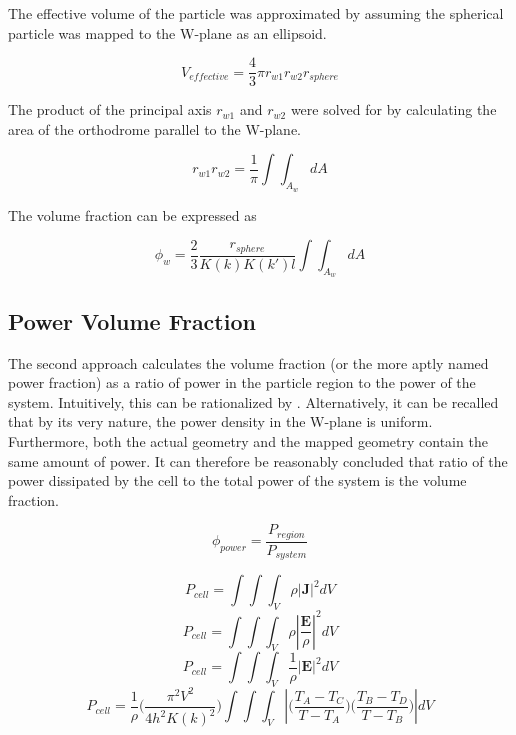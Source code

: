 \par The effective volume of the particle was approximated by assuming the spherical particle was mapped to the W-plane as an ellipsoid. 

\begin{equation}
    V_{effective} = \frac{4}{3}\pi r_{w1}r_{w2}r_{sphere}
\end{equation}

\noindent The product of the principal axis $r_{w1}$ and $r_{w2}$ were solved for by calculating the area of the orthodrome parallel to the W-plane.

\begin{equation}
    r_{w1}r_{w2} = \frac{1}{\pi}\int\int_{A_w} dA
\end{equation}

\par The volume fraction can be expressed as

\begin{equation}
    \phi_w = \frac{2}{3} \frac{r_{sphere}}{K(k)K(k')l} \int\int_{A_w} dA
\end{equation}

\subsection*{Power Volume Fraction}
\par The second approach calculates the volume fraction (or the more aptly named power fraction) as a ratio of power in the particle region to the power of the system. Intuitively, this can be rationalized by . Alternatively, it can be recalled that by its very nature, the power density in the W-plane is uniform. Furthermore, both the actual geometry and the mapped geometry contain the same amount of power. It can therefore be reasonably concluded that ratio of the power dissipated by the cell to the total power of the system is the volume fraction.

\begin{equation}
    \phi_{power} = \frac{P_{region}}{P_{system}}
\end{equation}

\begin{equation}
    P_{cell} = \int\int\int_V \rho |\boldsymbol{J}|^2 dV
\end{equation}
\begin{equation}
    P_{cell} = \int\int\int_V \rho |\frac{\boldsymbol{E}}{\rho}|^2 dV
\end{equation}
\begin{equation}
    P_{cell} = \int\int\int_V \frac{1}{\rho} |\boldsymbol{E}|^2 dV
\end{equation}
\begin{equation}
    P_{cell} = \frac{1}{\rho}\bigg(\frac{\pi^2V^2}{4h^2K(k)^2}\bigg)\int\int\int_V |\Big(\frac{T_A-T_C}{T-T_A}\Big)\Big(\frac{T_B-T_D}{T-T_B}\Big)| dV
\end{equation}

